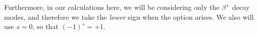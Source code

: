 Furthermore, in our calculations here, we will be considering only the $\beta^+$ decay modes, and therefore we take the \emph{lower} sign when the option arises.  We also will use $s=0$, so that $(-1)^s = +1$.


